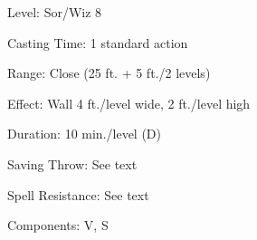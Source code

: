 
\begin{description*}
\item[Level:] Sor/Wiz 8
\item[Casting Time:] 1 standard action
\item[Range:] Close (25 ft. + 5 ft./2 levels)
\item[Effect:] Wall 4 ft./level wide, 2 ft./level high
\item[Duration:] 10 min./level (D)
\item[Saving Throw:] See text
\item[Spell Resistance:] See text
\item[Components:] V, S
\end{description*}

